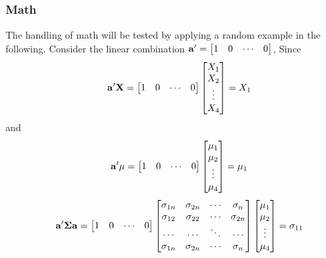 \subsubsection{Math}
\label{sec:math}
The handling of math will be tested by applying a random example in the following.
Consider the linear combination $\mathbf a'=\begin{bmatrix} 1 & 0 & \cdots & 0 \end{bmatrix}$, Since
\begin{equation}
    \mathbf a'\mathbf X = \begin{bmatrix} 1 & 0 & \cdots & 0 \end{bmatrix}\begin{bmatrix} X_1 \\ X_2  \\ \vdots \\ X_4\end{bmatrix} = X_1
\end{equation}
and
\begin{equation}
    \mathbf a'\mathbf{\mu} = \begin{bmatrix} 1 & 0 & \cdots & 0 \end{bmatrix}\begin{bmatrix} \mu_1 \\ \mu_2  \\ \vdots \\ \mu_4\end{bmatrix} = \mu_1
\end{equation}
\begin{equation}
    \mathbf a'\mathbf{\Sigma}\mathbf a = \begin{bmatrix} 1 & 0 & \cdots & 0 \end{bmatrix}
    \begin{bmatrix}
        \sigma_{1n} & \sigma_{2n} & \cdots & \sigma_{n} \\
        \sigma_{12} & \sigma_{22} & \cdots & \sigma_{2n} \\
        \cdots & \cdots & \ddots & \cdots \\
        \sigma_{1n} & \sigma_{2n} & \cdots & \sigma_{n} \\
    \end{bmatrix}
    \begin{bmatrix} \mu_1 \\ \mu_2  \\ \vdots \\ \mu_4\end{bmatrix} = \sigma_{11}
\end{equation}